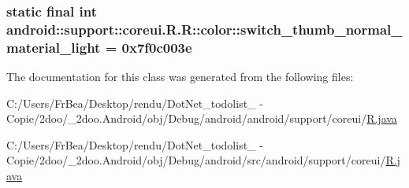 \hypertarget{classandroid_1_1support_1_1coreui_1_1_r_1_1color_c2025b851fd85dcde4d15872cdeec082}{
\subsubsection[{switch\_\-thumb\_\-normal\_\-material\_\-light}]{\setlength{\rightskip}{0pt plus 5cm}static final int android::support::coreui.R.R::color::switch\_\-thumb\_\-normal\_\-material\_\-light = 0x7f0c003e}}
\label{classandroid_1_1support_1_1coreui_1_1_r_1_1color_c2025b851fd85dcde4d15872cdeec082}




The documentation for this class was generated from the following files:\begin{CompactItemize}
\item 
C:/Users/FrBea/Desktop/rendu/DotNet\_\-todolist\_ - Copie/2doo/\_\-2doo.Android/obj/Debug/android/android/support/coreui/\hyperlink{android_2support_2coreui_2_r_8java}{R.java}\item 
C:/Users/FrBea/Desktop/rendu/DotNet\_\-todolist\_ - Copie/2doo/\_\-2doo.Android/obj/Debug/android/src/android/support/coreui/\hyperlink{src_2android_2support_2coreui_2_r_8java}{R.java}\end{CompactItemize}
